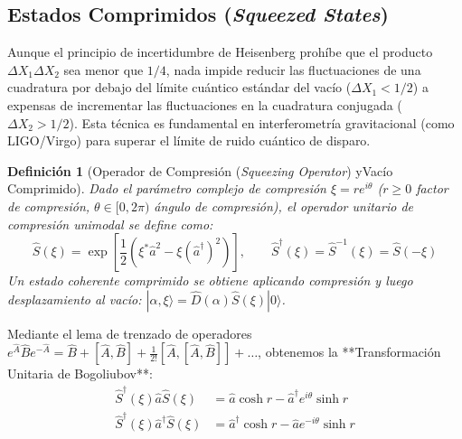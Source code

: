 \documentclass[11pt,a4paper]{book}
\newtheorem{definicion}{Definición}[chapter]
\begin{document}
\subsection[Estados comprimidos]{Estados Comprimidos (\textit{Squeezed States})}

Aunque el principio de incertidumbre de Heisenberg prohíbe que el producto $\Delta X_1 \Delta X_2$ sea menor que $1/4$, nada impide reducir las fluctuaciones de una cuadratura por debajo del límite cuántico estándar del vacío ($\Delta X_1 < 1/2$) a expensas de incrementar las fluctuaciones en la cuadratura conjugada ($\Delta X_2 > 1/2$). Esta técnica es fundamental en interferometría gravitacional (como LIGO/Virgo) para superar el límite de ruido cuántico de disparo.

\begin{definicion}[Operador de Compresión (\textit{Squeezing Operator}) yVacío Comprimido]
Dado el parámetro complejo de compresión $\xi = r e^{i\theta}$ ($r \geq 0$ factor de compresión, $\theta \in [0, 2\pi)$ ángulo de compresión), el operador unitario de compresión unimodal se define como:
\begin{equation}
\hat{S}(\xi) = \exp\left[ \frac{1}{2}\left( \xi^* \hat{a}^2 - \xi (\hat{a}^\dagger)^2 \right) \right], \qquad \hat{S}^\dagger(\xi) = \hat{S}^{-1}(\xi) = \hat{S}(-\xi)
\end{equation}
Un estado coherente comprimido se obtiene aplicando compresión y luego desplazamiento al vacío: $|\alpha, \xi\rangle = \hat{D}(\alpha)\hat{S}(\xi)|0\rangle$.
\end{definicion}

Mediante el lema de trenzado de operadores $e^{\hat{A}}\hat{B}e^{-\hat{A}} = \hat{B} + [\hat{A},\hat{B}] + \frac{1}{2!}[\hat{A},[\hat{A},\hat{B}]] + \dots$, obtenemos la **Transformación Unitaria de Bogoliubov**:
\begin{align}
\hat{S}^\dagger(\xi) \hat{a} \hat{S}(\xi) &= \hat{a} \cosh r - \hat{a}^\dagger e^{i\theta} \sinh r \\
\hat{S}^\dagger(\xi) \hat{a}^\dagger \hat{S}(\xi) &= \hat{a}^\dagger \cosh r - \hat{a} e^{-i\theta} \sinh r
\end{align}
\end{document}
